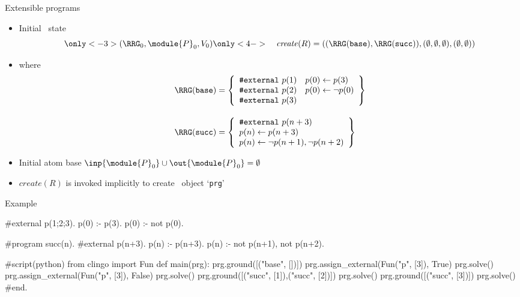 \begin{frame}{Extensible programs}
  \begin{itemize}
  \item Initial \clingo\ state
    \[
    \only<-3>{(\boldsymbol{\RRG}_0,\module{P}_0,V_0 )}\only<4->{\hspace{10pt}\mathit{create}(R)}
    =
    (
    (\RRG(\mathtt{base}),\RRG(\mathtt{succ})),(\emptyset,\emptyset,\emptyset),(\emptyset,\emptyset)
    )
    \]
  \item[] where 
    \begin{align*}
      \RRG(\mathtt{base})
      &=
      \left\{
        \begin{array}{ll}
          \texttt{\#external}~p(1) & p(0)\leftarrow p(3)      \\
          \texttt{\#external}~p(2) & p(0)\leftarrow \neg p(0)\\
          \texttt{\#external}~p(3) &\\
        \end{array}
      \right\}
      \\[10pt]
      \RRG(\mathtt{succ})
      &=
      \left\{
        \begin{array}{l}
          \texttt{\#external}~p(n+3)\\
          p(n)\leftarrow p(n+3)\\
          p(n)\leftarrow \neg p(n+1),\neg p(n+2)
        \end{array}
      \right\}
    \end{align*}
  \item<2-> Initial atom base
    \(
    \inp{\module{P}_0}\cup\out{\module{P}_0}=\emptyset
    \)
  \item <only@5>  $\mathit{create}(R)$ is invoked implicitly to create \clingo\ object `\texttt{prg}'
  \end{itemize}
\end{frame}
\begin{frame}[fragile]{Example}
\scriptsize\vspace{-10pt}%
\begin{semiverbatim}
   #external p(1;2;3).
   p(0) :- p(3).
   p(0) :- not p(0).

   #program succ(n).
   #external p(n+3).
   p(n) :- p(n+3).
   p(n) :- not p(n+1), not p(n+2).

   #script(python)
   from clingo import Fun
   def main(prg):
     \alert<2>{prg.ground([("base", [])])}
       prg.assign_external(Fun("p", [3]), True)
       prg.solve()
       prg.assign_external(Fun("p", [3]), False)
       prg.solve()
       prg.ground([("succ", [1]),("succ", [2])])
       prg.solve()
       prg.ground([("succ", [3])])
       prg.solve()
   #end.
\end{semiverbatim}
\end{frame}
